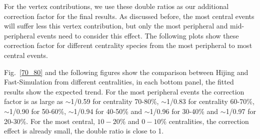 \begin{figure}
\end{figure}

For the vertex contributions, we use these double ratios as our additional correction factor for the final results. As discussed before, the most central events will suffer less this vertex contribution, but only the most peripheral and mid-peripheral events need to consider this effect. The following plots show these correction factor for different centrality species from the most peripheral to most central events.


Fig.~\ref{70_80} and the following figures show the comparison between Hijing and Fast-Simulation from different centralities, in each bottom panel, the fitted results show the expected trend. For the most peripheral events the correction factor is as large as $\sim$1/0.59 for centrality 70-80\%, $\sim$1/0.83 for centrality 60-70\%, $\sim$1/0.90 for 50-60\%, $\sim$1/0.94 for 40-50\% and $\sim$1/0.96 for 30-40\% and $\sim$1/0.97 for 20-30\%. For the most central, $10-20\%$ and $0-10\%$ centralities, the correction effect is already small, the double ratio is close to 1. $ $

